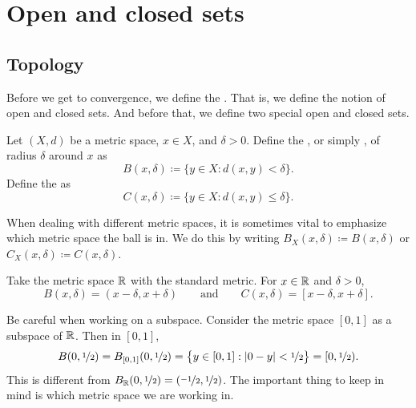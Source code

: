 
\sectionnewpage
\section{Open and closed sets}
\label{sec:mettop}



\subsection{Topology}

Before we get to convergence,
we define the \emph{}.
That is,
we define the notion of open and closed sets.
And before that,
we define two special open and closed sets.

\begin{defn}
Let $(X,d)$ be a metric space, $x \in X$, and $\delta > 0$.  Define
the \emph{}, or simply \emph{}, of radius $\delta$
around $x$ as
\begin{equation*}
B(x,\delta) \coloneqq \bigl\{ y \in X : d(x,y) < \delta \bigr\} .
\end{equation*}
Define the \emph{} as
\begin{equation*}
C(x,\delta) \coloneqq \bigl\{ y \in X : d(x,y) \leq \delta \bigr\} .
\end{equation*}
\end{defn}

When dealing with different metric spaces, it is sometimes 
vital to emphasize which metric space the ball is in.  We do this by
writing $B_X(x,\delta) \coloneqq B(x,\delta)$ or $C_X(x,\delta) \coloneqq C(x,\delta)$.

\begin{example}
Take the metric space ${\mathbb{R}}$ with the standard metric.  For
$x \in {\mathbb{R}}$ and $\delta > 0$,
\begin{equation*}
B(x,\delta) = (x-\delta,x+\delta) \qquad \text{and} \qquad
C(x,\delta) = [x-\delta,x+\delta] .
\end{equation*}
\end{example}

\begin{example}
Be careful when working on a subspace.  Consider the
metric space $[0,1]$ as a subspace of ${\mathbb{R}}$.  Then in $[0,1]$,
\begin{equation*}
B(0,\nicefrac{1}{2}) = B_{[0,1]}(0,\nicefrac{1}{2})
= \bigl\{ y \in [0,1] : \lvert {0-y} \rvert < \nicefrac{1}{2} \bigr\}
= [0,\nicefrac{1}{2}) .
\end{equation*}
This is different from $B_{{\mathbb{R}}}(0,\nicefrac{1}{2}) =
(\nicefrac{-1}{2},\nicefrac{1}{2})$.
The important thing to keep in mind is which metric space we are working
in.
\end{example}

